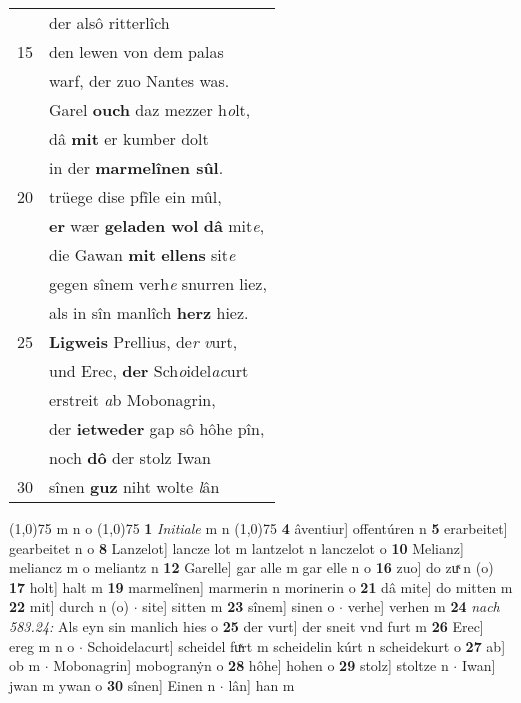 \documentclass[8pt,a4paper,notitlepage]{article}
\begin{document}
\begin{table}[ht]
\begin{minipage}[t]{0.5\linewidth}
\begin{tabular}{rl}
 & der alsô ritterlîch\\ 
15 & den lewen von dem palas\\ 
 & warf, der zuo Nantes was.\\ 
 & Garel \textbf{ouch} daz mezzer h\textit{o}lt,\\ 
 & dâ \textbf{mit} er kumber dolt\\ 
 & in der \textbf{marmelînen sûl}.\\ 
20 & trüege dise pfîle ein mûl,\\ 
 & \textbf{er} wær \textbf{geladen wol} \textbf{dâ} mit\textit{e},\\ 
 & die Gawan \textbf{mit} \textbf{ellens} sit\textit{e}\\ 
 & gegen sînem verh\textit{e} snurren liez,\\ 
 & als in sîn manlîch \textbf{herz} hiez.\\ 
25 & \textbf{Ligweis} Prellius, de\textit{r} \textit{v}urt,\\ 
 & und Erec, \textbf{der} Sch\textit{o}idel\textit{ac}urt\\ 
 & erstreit \textit{a}b Mobonagrin,\\ 
 & der \textbf{ietweder} gap sô hôhe pîn,\\ 
 & noch \textbf{dô} der stolz Iwan\\ 
30 & sînen \textbf{guz} niht wolte \textit{l}ân\\ 
\end{tabular}
\scriptsize
\line(1,0){75} \newline
m n o \newline
\line(1,0){75} \newline
\textbf{1} \textit{Initiale} m n  \newline
\line(1,0){75} \newline
\textbf{4} âventiur] offentúren n \textbf{5} erarbeitet] gearbeitet n o \textbf{8} Lanzelot] lancze lot m lantzelot n lanczelot o \textbf{10} Melianz] meliancz m o meliantz n \textbf{12} Garelle] gar alle m gar elle n o \textbf{16} zuo] do zuͯ n (o) \textbf{17} holt] halt m \textbf{19} marmelînen] marmerin n morinerin o \textbf{21} dâ mite] do mitten m \textbf{22} mit] durch n (o)  $\cdot$ site] sitten m \textbf{23} sînem] sinen o  $\cdot$ verhe] verhen m \textbf{24} \textit{nach 583.24:} Als eyn sin manlich hies o  \textbf{25} der vurt] der sneit vnd furt m \textbf{26} Erec] ereg m n o  $\cdot$ Schoidelacurt] scheidel fuͯrt m scheidelin kúrt n scheidekurt o \textbf{27} ab] ob m  $\cdot$ Mobonagrin] mobogranẏn o \textbf{28} hôhe] hohen o \textbf{29} stolz] stoltze n  $\cdot$ Iwan] jwan m ywan o \textbf{30} sînen] Einen n  $\cdot$ lân] han m \newline
\end{minipage}
\end{table}
\end{document}
